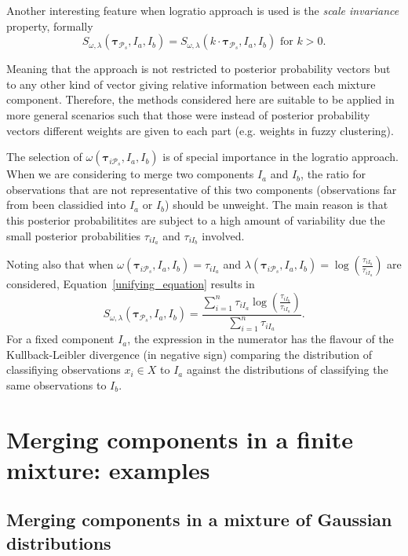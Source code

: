 \documentclass[submit]{smj}
\theoremstyle{definition}
\newcommand{\m}[1]{\boldsymbol{#1}}
\begin{document}
Another interesting feature when logratio approach is used is the \emph{scale invariance} property, formally
\[
S_{\omega, \lambda}( \m\tau_{\mathcal{P}_s},  I_a,  I_b) = S_{\omega, \lambda}(k\cdot \m\tau_{\mathcal{P}_s},  I_a,  I_b) \text{ for $k>0$.}
\] 

Meaning that the approach is not restricted to posterior probability vectors but to any other kind of vector giving relative information between each mixture component. Therefore, the methods considered here are suitable to be applied in more general scenarios such that those were instead of posterior probability vectors different weights are given to each part (e.g. weights in fuzzy clustering).

The selection of $\omega(\m\tau_{i \mathcal{P}_s},  I_a,  I_b)$ is of special importance in the logratio approach. When we are considering to merge two components $I_a$ and $I_b$, the ratio for observations that are not representative of this two components (observations far from been classidied into $I_a$ or $I_b$) should be unweight. The main reason is that this posterior probabilitites are subject to a high amount of variability due the small posterior probabilities $\tau_{iI_a}$ and $\tau_{iI_b}$ involved.

Noting also that when $\omega(\m\tau_{i \mathcal{P}_s},  I_a,  I_b) =  \tau_{iI_a}$ and $\lambda(\m\tau_{i \mathcal{P}_s},  I_a,  I_b) = \log \left(\frac{ \tau_{iI_b} }{ \tau_{iI_a} }\right)$ are considered, Equation~\ref{unifying_equation} results in
\[
S_{\omega, \lambda}( \m\tau_{\mathcal{P}_s},  I_a,  I_b) = \frac{\sum_{i=1}^n\tau_{iI_a}  \log \left(\frac{ \tau_{iI_b} }{ \tau_{iI_a} }\right)}{\sum_{i=1}^n \tau_{iI_a}}.
\]
For a fixed component $I_a$, the expression in the numerator has the flavour of the Kullback-Leibler divergence (in negative sign) comparing the distribution of classifiying observations $x_i \in X$ to $I_a$ against the distributions of classifying the same observations to $I_b$.

\section{Merging components in a finite mixture: examples}\label{merging_examples_dist}

\subsection{Merging components in a mixture of Gaussian distributions}
\end{document}
